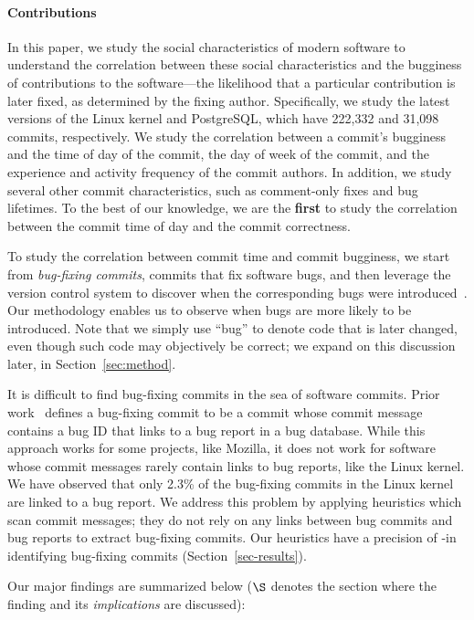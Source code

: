 \paragraph{Contributions}
In this paper, we study the social characteristics of modern software to understand 
the correlation between these social characteristics and the bugginess of contributions to the software---the likelihood that a particular contribution is later fixed, as determined by the fixing author.  
Specifically, we study the latest versions of the Linux kernel and PostgreSQL, which have 222,332 and 31,098 commits, respectively.
We study the correlation between a commit's bugginess
and the time of day of the commit, the day of week of the commit, and
the experience and activity frequency of the commit authors.
%
In addition, we study several other commit characteristics, such as
comment-only fixes and bug lifetimes. 
%
To the best of our
knowledge, we are the {\bf first} to study the correlation between the commit time of day and
the commit correctness. 

To study the correlation between commit time and commit bugginess, we
start from {\em bug-fixing commits}, commits that fix software bugs,
and then leverage the version control system to discover when the
corresponding bugs were introduced~\cite{sliwerski-msr-2005}.  Our
methodology enables us to observe when bugs are more likely to be
introduced.  Note that we simply use ``bug'' to denote code
that is later changed, even though such code may objectively be
correct; we expand on this discussion later, in Section~\ref{sec:method}.

It is difficult to find bug-fixing commits in the sea of software commits.
Prior work~\cite{sliwerski-msr-2005} defines a bug-fixing commit to be a commit whose commit message contains a bug 
ID that links to a bug report in a bug database. While this
approach works for some projects, like Mozilla, it does not work for software whose commit messages
rarely contain links to bug reports, like the Linux kernel.
We have observed that only 2.3\% of the bug-fixing commits in the Linux kernel are linked to a bug report.
We address this problem by applying heuristics 
which scan commit messages; they do not rely on any links between bug commits and bug reports to extract bug-fixing commits.
Our heuristics have a precision of \postP-\linuxP in identifying bug-fixing commits (Section~\ref{sec-results}).

Our major findings are summarized below ($\S$ denotes the section where the finding and its {\em implications} are discussed):

